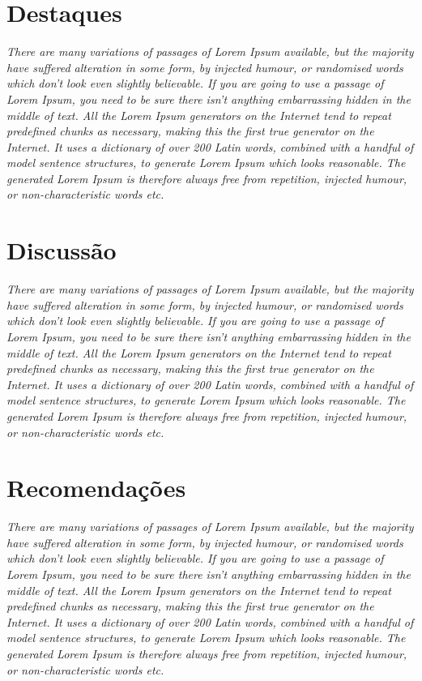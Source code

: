 \documentclass[
  letterpaper,
]{scrbook}
\begin{document}
\section{Destaques}\label{destaques-2}

\emph{There are many variations of passages of Lorem Ipsum available,
but the majority have suffered alteration in some form, by injected
humour, or randomised words which don't look even slightly believable.
If you are going to use a passage of Lorem Ipsum, you need to be sure
there isn't anything embarrassing hidden in the middle of text. All the
Lorem Ipsum generators on the Internet tend to repeat predefined chunks
as necessary, making this the first true generator on the Internet. It
uses a dictionary of over 200 Latin words, combined with a handful of
model sentence structures, to generate Lorem Ipsum which looks
reasonable. The generated Lorem Ipsum is therefore always free from
repetition, injected humour, or non-characteristic words etc.}

\section{Discussão}\label{discussuxe3o-2}

\emph{There are many variations of passages of Lorem Ipsum available,
but the majority have suffered alteration in some form, by injected
humour, or randomised words which don't look even slightly believable.
If you are going to use a passage of Lorem Ipsum, you need to be sure
there isn't anything embarrassing hidden in the middle of text. All the
Lorem Ipsum generators on the Internet tend to repeat predefined chunks
as necessary, making this the first true generator on the Internet. It
uses a dictionary of over 200 Latin words, combined with a handful of
model sentence structures, to generate Lorem Ipsum which looks
reasonable. The generated Lorem Ipsum is therefore always free from
repetition, injected humour, or non-characteristic words etc.}

\section{Recomendações}\label{recomendauxe7uxf5es-2}

\emph{There are many variations of passages of Lorem Ipsum available,
but the majority have suffered alteration in some form, by injected
humour, or randomised words which don't look even slightly believable.
If you are going to use a passage of Lorem Ipsum, you need to be sure
there isn't anything embarrassing hidden in the middle of text. All the
Lorem Ipsum generators on the Internet tend to repeat predefined chunks
as necessary, making this the first true generator on the Internet. It
uses a dictionary of over 200 Latin words, combined with a handful of
model sentence structures, to generate Lorem Ipsum which looks
reasonable. The generated Lorem Ipsum is therefore always free from
repetition, injected humour, or non-characteristic words etc.}
\end{document}

